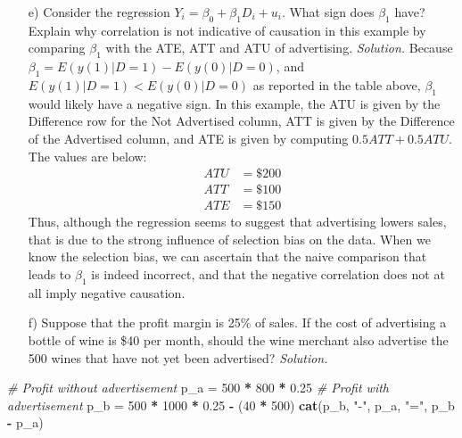 \documentclass[
]{article}
\newenvironment{Shaded}{\begin{snugshade}}{\end{snugshade}}
\newcommand{\CommentTok}[1]{\textcolor[rgb]{0.56,0.35,0.01}{\textit{#1}}}
\newcommand{\DecValTok}[1]{\textcolor[rgb]{0.00,0.00,0.81}{#1}}
\newcommand{\FloatTok}[1]{\textcolor[rgb]{0.00,0.00,0.81}{#1}}
\newcommand{\KeywordTok}[1]{\textcolor[rgb]{0.13,0.29,0.53}{\textbf{#1}}}
\newcommand{\NormalTok}[1]{#1}
\newcommand{\OperatorTok}[1]{\textcolor[rgb]{0.81,0.36,0.00}{\textbf{#1}}}
\newcommand{\StringTok}[1]{\textcolor[rgb]{0.31,0.60,0.02}{#1}}
\begin{document}
\begin{enumerate}
\item[e)] Consider the regression $Y_i = \beta_0 + \beta_1D_i + u_i$. What sign does $\beta_1$ have? Explain why correlation is not indicative of causation in this example by comparing $\beta_1$ with the ATE, ATT and ATU of advertising.
\newline
\newline
\textit{Solution.} Because $\beta_1 = E(y(1)|D=1) - E(y(0)|D=0)$, and $E(y(1)|D=1) < E(y(0)|D=0)$ as reported in the table above, $\beta_1$ would likely have a negative sign.  
In this example, the ATU is given by the Difference row for the Not Advertised column, ATT is given by the Difference of the Advertised column, and ATE is given by computing $0.5 ATT + 0.5 ATU$. The values are below:
\[\begin{aligned}
ATU &= \$200 \\
ATT &= \$100 \\
ATE &= \$150
\end{aligned}\]
Thus, although the regression seems to suggest that advertising lowers sales, that is due to the strong influence of selection bias on the data. When we know the selection bias, we can ascertain that the naive comparison that leads to $\beta_1$ is indeed incorrect, and that the negative correlation does not at all imply negative causation. 

\item[f)] Suppose that the profit margin is 25\% of sales. If the cost of advertising a bottle of wine is \$40 per month, should the wine merchant also advertise the 500 wines that have not yet been advertised?
\newline
\newline
\textit{Solution.} 
\end{enumerate}

\begin{Shaded}
\begin{Highlighting}[]
\CommentTok{# Profit without advertisement }
\NormalTok{p_a =}\StringTok{ }\DecValTok{500} \OperatorTok{*}\StringTok{ }\DecValTok{800} \OperatorTok{*}\StringTok{ }\FloatTok{0.25}
\CommentTok{# Profit with advertisement}
\NormalTok{p_b =}\StringTok{ }\DecValTok{500} \OperatorTok{*}\StringTok{ }\DecValTok{1000} \OperatorTok{*}\StringTok{ }\FloatTok{0.25} \OperatorTok{-}\StringTok{ }\NormalTok{(}\DecValTok{40} \OperatorTok{*}\StringTok{ }\DecValTok{500}\NormalTok{)}
\KeywordTok{cat}\NormalTok{(p_b, }\StringTok{"-"}\NormalTok{, p_a, }\StringTok{"="}\NormalTok{, p_b }\OperatorTok{-}\StringTok{ }\NormalTok{p_a)}
\end{Highlighting}
\end{Shaded}
\end{document}
